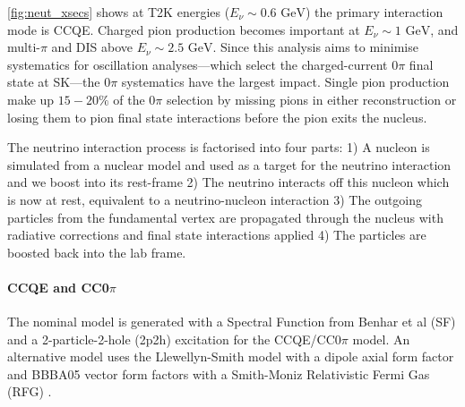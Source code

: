 \autoref{fig:neut_xsecs} shows at T2K energies ($E_\nu\sim0.6\text{ GeV}$) the primary interaction mode is CCQE. Charged pion production becomes important at $E_\nu\sim1\text{ GeV}$, and multi-$\pi$ and DIS above $E_\nu\sim2.5\text{ GeV}$. Since this analysis aims to minimise systematics for oscillation analyses---which select the charged-current 0$\pi$ final state at SK---the 0$\pi$ systematics have the largest impact. Single pion production make up $15-20\%$ of the 0$\pi$ selection by missing pions in either reconstruction or losing them to pion final state interactions before the pion exits the nucleus.

The neutrino interaction process is factorised into four parts: 1) A nucleon is simulated from a nuclear model and used as a target for the neutrino interaction and we boost into its rest-frame 2) The neutrino interacts off this nucleon which is now at rest, equivalent to a neutrino-nucleon interaction 3) The outgoing particles from the fundamental vertex are propagated through the nucleus with radiative corrections and final state interactions applied 4) The particles are boosted back into the lab frame.

\paragraph{CCQE and CC0$\pi$}
The nominal model is generated with a Spectral Function from Benhar et al (SF) \cite{benhar} and a 2-particle-2-hole (2p2h) excitation \cite{nieves1,nieves2} for the CCQE/CC0$\pi$ model. An alternative model uses the Llewellyn-Smith model\cite{llewelyn-smith} with a dipole axial form factor and BBBA05 vector form factors \cite{bbba05} with a Smith-Moniz Relativistic Fermi Gas (RFG) \cite{Smith-Moniz}. 

